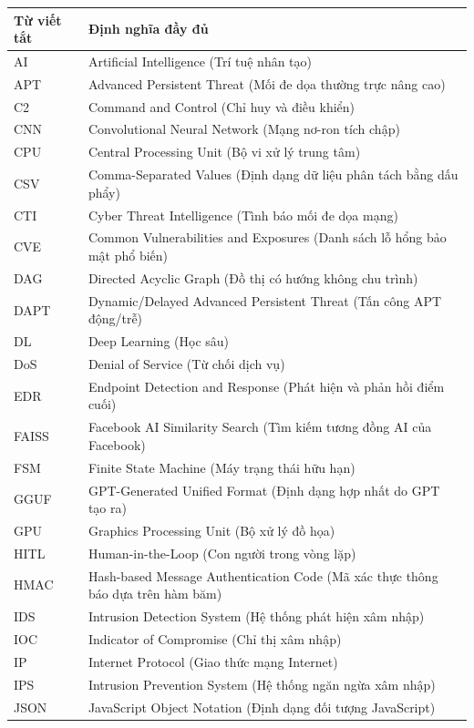 \documentclass[12pt,a4paper]{report}
\begin{document}
\begin{longtable}{lp{}}
\textbf{Từ viết tắt} & \textbf{Định nghĩa đầy đủ} \\
\midrule
AI & Artificial Intelligence (Trí tuệ nhân tạo) \\
APT & Advanced Persistent Threat (Mối đe dọa thường trực nâng cao) \\
C2 & Command and Control (Chỉ huy và điều khiển) \\
CNN & Convolutional Neural Network (Mạng nơ-ron tích chập) \\
CPU & Central Processing Unit (Bộ vi xử lý trung tâm) \\
CSV & Comma-Separated Values (Định dạng dữ liệu phân tách bằng dấu phẩy) \\
CTI & Cyber Threat Intelligence (Tình báo mối đe dọa mạng) \\
CVE & Common Vulnerabilities and Exposures (Danh sách lỗ hổng bảo mật phổ biến) \\
DAG & Directed Acyclic Graph (Đồ thị có hướng không chu trình) \\
DAPT & Dynamic/Delayed Advanced Persistent Threat (Tấn công APT động/trễ) \\
DL & Deep Learning (Học sâu) \\
DoS & Denial of Service (Từ chối dịch vụ) \\
EDR & Endpoint Detection and Response (Phát hiện và phản hồi điểm cuối) \\
FAISS & Facebook AI Similarity Search (Tìm kiếm tương đồng AI của Facebook) \\
FSM & Finite State Machine (Máy trạng thái hữu hạn) \\
GGUF & GPT-Generated Unified Format (Định dạng hợp nhất do GPT tạo ra) \\
GPU & Graphics Processing Unit (Bộ xử lý đồ họa) \\
HITL & Human-in-the-Loop (Con người trong vòng lặp) \\
HMAC & Hash-based Message Authentication Code (Mã xác thực thông báo dựa trên hàm băm) \\
IDS & Intrusion Detection System (Hệ thống phát hiện xâm nhập) \\
IOC & Indicator of Compromise (Chỉ thị xâm nhập) \\
IP & Internet Protocol (Giao thức mạng Internet) \\
IPS & Intrusion Prevention System (Hệ thống ngăn ngừa xâm nhập) \\
JSON & JavaScript Object Notation (Định dạng đối tượng JavaScript) \\

\end{longtable}
\end{document}
